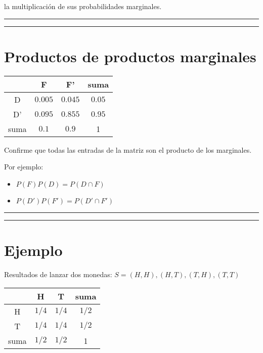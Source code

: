 \documentclass[
]{book}
\providecommand{\tightlist}{%
  \setlength{\itemsep}{0pt}\setlength{\parskip}{0pt}}
\begin{document}
la multiplicación de sus probabilidades marginales.

\begin{center}\rule{0.5\linewidth}{0.5pt}\end{center}

\begin{center}\rule{0.5\linewidth}{0.5pt}\end{center}

\hypertarget{productos-de-productos-marginales}{%
\section{Productos de productos marginales}\label{productos-de-productos-marginales}}

\begin{longtable}[]{@{}cccc@{}}
\toprule
& F & F' & suma \\
\midrule
\endhead
D & \(0.005\) & \(0.045\) & \(0.05\) \\
D' & \(0.095\) & \(0.855\) & \(0.95\) \\
suma & \(0.1\) & \(0.9\) & 1 \\
\bottomrule
\end{longtable}

Confirme que todas las entradas de la matriz son el producto de los marginales.

Por ejemplo:

\begin{itemize}
\tightlist
\item
  \(P(F)P(D)= P(D \cap F)\)
\item
  \(P(D')P(F')=P(D' \cap F')\)
\end{itemize}

\begin{center}\rule{0.5\linewidth}{0.5pt}\end{center}

\begin{center}\rule{0.5\linewidth}{0.5pt}\end{center}

\hypertarget{ejemplo-5}{%
\section{Ejemplo}\label{ejemplo-5}}

Resultados de lanzar dos monedas: \(S={(H,H), (H,T), (T,H), (T,T)}\)

\begin{longtable}[]{@{}cccc@{}}
\toprule
& H & T & suma \\
\midrule
\endhead
H & \(1/4\) & \(1/4\) & \(1/2\) \\
T & \(1/4\) & \(1/4\) & \(1/2\) \\
suma & \(1/2\) & \(1/2\) & 1 \\
\bottomrule
\end{longtable}
\end{document}
